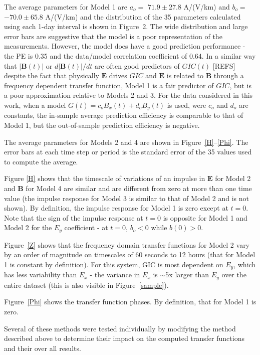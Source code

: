 \documentclass[draft,linenumbers]{agujournal2018}
\begin{document}
The average parameters for Model 1 are $a_o =$ $71.9 \pm 27.8$ A/(V/km) and $b_o =$ $-70.0 \pm 65.8$ A/(V/km) and the distribution of the 35 parameters calculated using each 1-day interval is shown in Figure~2. The wide distribution and large error bars are suggestive that the model is a poor representation of the measurements. However, the model does have a good prediction performance - the PE is 0.35 and the data/model correlation coefficient of 0.64. In a similar way that $|\mathbf{B}(t)|$ or $d|\mathbf{B}(t)|/dt$ are often good predictors of $GIC(t)$ [REFS] despite the fact that physically $\mathbf{E}$ drives $GIC$ and $\mathbf{E}$ is related to $\mathbf{B}$ through a frequency dependent transfer function, Model 1 is a fair predictor of $GIC$, but is a poor approximation relative to Models 2 and 3. For the data considered in this work, when a model $G(t) = c_oB_x(t) + d_oB_y(t)$ is used, were $c_o$ and $d_o$ are constants, the in-sample average prediction efficiency is comparable to that of Model 1, but the out-of-sample prediction efficiency is negative.

The average parameters for Models 2 and 4 are shown in Figure~\ref{H}--\ref{Phi}. The error bars at each time step or period is the standard error of the 35 values used to compute the average. 

Figure \ref{H} shows that the timescale of variations of an impulse in $\mathbf{E}$ for Model 2 and $\mathbf{B}$ for Model 4 are similar and are different from zero at more than one time value (the impulse response for Model 3 is similar to that of Model 2 and is not shown). By definition, the impulse response for Model 1 is zero except at $t=0$. Note that the sign of the impulse response at $t=0$ is opposite for Model 1 and Model 2 for the $E_y$ coefficient - at $t=0$, $b_o < 0$ while $b(0)>0$.

Figure~\ref{Z} shows that the frequency domain transfer functions for Model 2 vary by an order of magnitude on timescales of 60 seconds to 12 hours (that for Model 1 is constant by definition). For this system, GIC is most dependent on $E_y$, which has less variability than $E_x$ - the variance in $E_x$ is $\sim$5x larger than $E_y$ over the entire dataset (this is also visible in Figure~\ref{sample}). 

Figure~\ref{Phi} shows the transfer function phases. By definition, that for Model 1 is zero.

Several of these methods were tested individually by modifying the method described above to determine their impact on the computed transfer functions and their over all results. 
\end{document}

